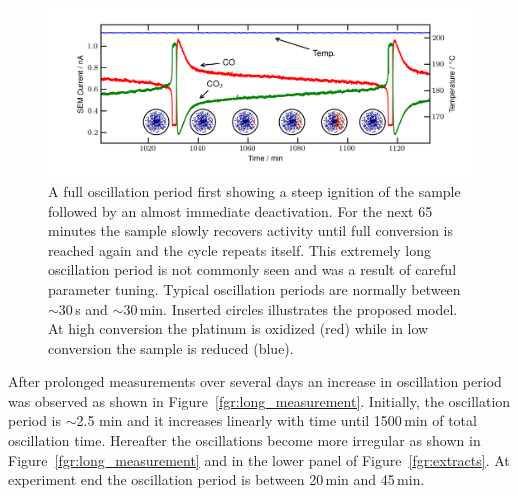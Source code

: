 \documentclass[journal=jacsat,manuscript=article]{achemso}
\begin{document}
\begin{figure}
  \includegraphics[width=16cm]{single_full_oscillation.png}
  \caption{A full oscillation period first showing a steep ignition of the
  sample followed by an almost immediate deactivation. For the next 65 minutes
  the sample slowly recovers activity until full conversion is reached again
  and the cycle repeats itself. This extremely long oscillation period is not
  commonly seen and was a result of careful parameter tuning. Typical
  oscillation periods are normally between $\sim$30\,s and $\sim$30\,min.
  Inserted circles illustrates the proposed model. At high conversion the
  platinum is oxidized (red) while in low conversion the sample is reduced
  (blue).} \label{fgr:full_oscillation}
\end{figure}

After prolonged measurements over several days an increase in oscillation
period was observed as shown in Figure~\ref{fgr:long_measurement}. Initially, the
oscillation period is $\sim$2.5 min and it increases linearly with time until 1500\,min
of total oscillation time. Hereafter the oscillations become more irregular
as shown in Figure~\ref{fgr:long_measurement} and in the lower panel of Figure~\ref{fgr:extracts}. At
experiment end the oscillation period is between 20\,min and 45\,min.
\end{document}
